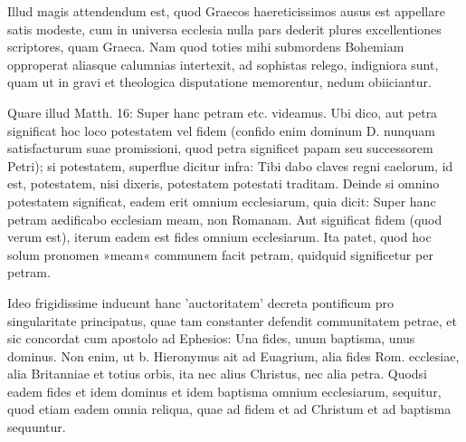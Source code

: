 Illud magis attendendum est, quod Graecos haereticissimos ausus est appellare satis modeste, cum in universa ecclesia nulla pars dederit plures excellentiones scriptores, quam Graeca. Nam quod toties mihi submordens Bohemiam opproperat aliasque calumnias intertexit, ad sophistas relego, indigniora sunt, quam ut in gravi et theologica disputatione memorentur, nedum obiiciantur.

Quare illud Matth. 16: Super hanc petram etc. videamus. Ubi dico, aut petra significat hoc loco potestatem vel fidem (confido enim dominum D. nunquam satisfacturum suae promissioni, quod petra significet papam seu successorem Petri); si potestatem, superflue dicitur infra: Tibi dabo claves regni caelorum, id est, potestatem, nisi dixeris, potestatem potestati traditam. Deinde si omnino potestatem significat, eadem erit omnium ecclesiarum, quia dicit: Super hanc petram aedificabo ecclesiam meam, non Romanam. Aut significat fidem (quod verum est), iterum eadem est fides omnium ecclesiarum. Ita patet, quod hoc solum pronomen »meam« communem facit petram, quidquid significetur per petram.

Ideo frigidissime inducunt hanc 'auctoritatem' decreta pontificum pro singularitate principatus, quae tam constanter defendit communitatem petrae, et sic concordat cum apostolo ad Ephesios: Una fides, unum baptisma, unus dominus. Non enim, ut b. Hieronymus ait ad Euagrium, alia fides Rom. ecclesiae, alia Britanniae et totius orbis, ita nec alius Christus, nec alia petra. Quodsi eadem fides et idem dominus et idem baptisma omnium ecclesiarum, sequitur, quod etiam eadem omnia reliqua, quae ad fidem et ad Christum et ad baptisma sequuntur.

